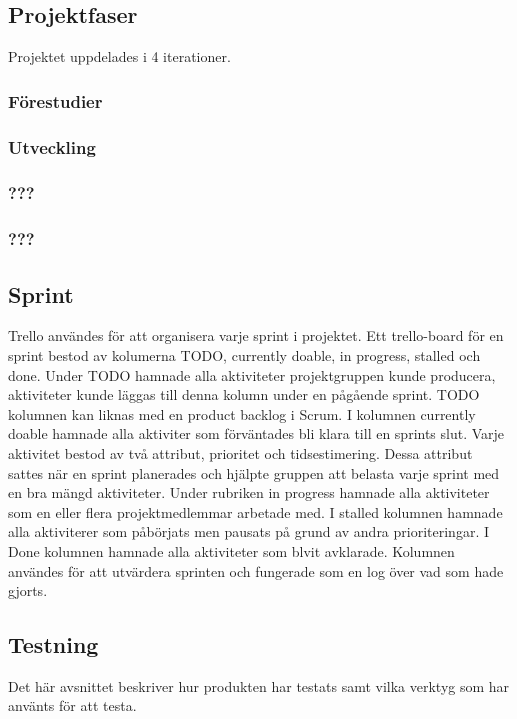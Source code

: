 \subsection{Projektfaser}
Projektet uppdelades i 4 iterationer.

\subsubsection*{Förestudier}
\subsubsection*{Utveckling}
\subsubsection*{???}
\subsubsection*{???}

\subsection{Sprint}
Trello användes för att organisera varje sprint i projektet. Ett trello-board för en sprint bestod av kolumerna TODO, currently doable, in progress, stalled och done. Under TODO hamnade alla aktiviteter projektgruppen kunde producera, aktiviteter kunde läggas till denna kolumn under en pågående sprint. TODO kolumnen kan liknas med en product backlog i Scrum. I kolumnen currently doable hamnade alla aktiviter som förväntades bli klara till en sprints slut. Varje aktivitet bestod av två attribut, prioritet och tidsestimering. Dessa attribut sattes när en sprint planerades och hjälpte gruppen att belasta varje sprint med en bra mängd aktiviteter. Under rubriken in progress hamnade alla aktiviteter som en eller flera projektmedlemmar arbetade med. I stalled kolumnen hamnade alla aktiviterer som påbörjats men pausats på grund av andra prioriteringar. I Done kolumnen hamnade alla aktiviteter som blvit avklarade. Kolumnen användes för att utvärdera sprinten och fungerade som en log över vad som hade gjorts.

\subsection{Testning}
Det här avsnittet beskriver hur produkten har testats samt vilka verktyg som har använts för att testa.

